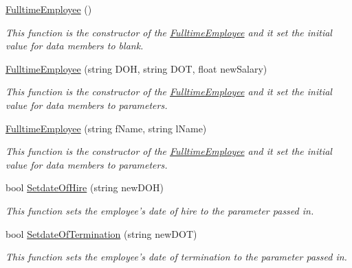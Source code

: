 \begin{DoxyCompactItemize}
\item 
\hyperlink{class_all_employees_1_1_fulltime_employee_a2f7744fed20aa3161c5ac5cd37c1a281}{Fulltime\-Employee} ()
\begin{DoxyCompactList}\small\item\em This function is the constructor of the \hyperlink{class_all_employees_1_1_fulltime_employee}{Fulltime\-Employee} and it set the initial value for data members to blank. \end{DoxyCompactList}\item 
\hyperlink{class_all_employees_1_1_fulltime_employee_a05bd67c76d9087c01bbf7e77b2290b0d}{Fulltime\-Employee} (string D\-O\-H, string D\-O\-T, float new\-Salary)
\begin{DoxyCompactList}\small\item\em This function is the constructor of the \hyperlink{class_all_employees_1_1_fulltime_employee}{Fulltime\-Employee} and it set the initial value for data members to parameters. \end{DoxyCompactList}\item 
\hyperlink{class_all_employees_1_1_fulltime_employee_a4ad92997dd93eb94d174414b348678a6}{Fulltime\-Employee} (string f\-Name, string l\-Name)
\begin{DoxyCompactList}\small\item\em This function is the constructor of the \hyperlink{class_all_employees_1_1_fulltime_employee}{Fulltime\-Employee} and it set the initial value for data members to parameters. \end{DoxyCompactList}\item 
bool \hyperlink{class_all_employees_1_1_fulltime_employee_a5c466f0a84fb25ed6db709ba8c976154}{Setdate\-Of\-Hire} (string new\-D\-O\-H)
\begin{DoxyCompactList}\small\item\em This function sets the employee's date of hire to the parameter passed in. \end{DoxyCompactList}\item 
bool \hyperlink{class_all_employees_1_1_fulltime_employee_a16a88024620e0e35740ae598bfdc7de5}{Setdate\-Of\-Termination} (string new\-D\-O\-T)
\begin{DoxyCompactList}\small\item\em This function sets the employee's date of termination to the parameter passed in. \end{DoxyCompactList}\item 

\end{DoxyCompactItemize}
